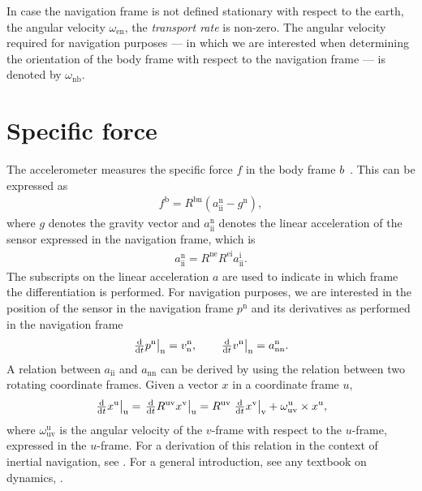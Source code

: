 In case the navigation frame is not defined stationary with respect to the earth, the angular velocity $\omega_{\text{en}}$, \ie the \emph{transport rate} is non-zero. The angular velocity required for navigation purposes --- in which we are interested when determining the orientation of the body frame with respect to the navigation frame --- is denoted by $\omega_{\text{nb}}$.

\section{Specific force}
\label{sec:sensors-specForce}
The accelerometer measures the specific force $f$ in the body frame $b$~\citep{tittertonW:1997}. This can be expressed as
\begin{align}
\label{eq:sen-imu-acc-i}
f^\text{b} = R^{\text{bn}} 
( a_{\text{ii}}^\text{n} - g^\text{n} ),
\end{align}
where $g$ denotes the gravity vector and $a_{\text{ii}}^\text{n}$ denotes the linear acceleration of the sensor expressed in the navigation frame, which is
\begin{align}
a_{\text{ii}}^\text{n} = R^{\text{ne}} R^{\text{ei}} a_{\text{ii}}^\text{i}.
\end{align}
The subscripts on the linear acceleration $a$ are used to indicate in which frame the differentiation is performed. For navigation purposes, we are interested in the position of the sensor in the navigation frame $p^\text{n}$ and its derivatives as performed in the navigation frame 
\begin{align}
\label{eq:sensors-defva}
\left. \tfrac{\textrm{d}}{\textrm{d} t} p^\text{n} \right|_\text{n} = v^\text{n}_\text{n}, \qquad \left. \tfrac{\textrm{d}}{\textrm{d} t} v^\text{n} \right|_\text{n} = a^\text{n}_\text{nn}.
\end{align}
A relation between $a_{\text{ii}}$ and $a_{\text{nn}}$ can be derived by using the relation between two rotating coordinate frames. Given a vector $x$ in a coordinate frame $u$,
\begin{align}
\label{eq:sensors-rotatingCF}
\left. \tfrac{\textrm{d}}{\textrm{d} t} x^\text{u} \right|_\text{u} = \left. \tfrac{\textrm{d}}{\textrm{d} t} R^\text{uv} x^\text{v} \right|_{\text{u}} = R^\text{uv} \left. \tfrac{\textrm{d}}{\textrm{d} t} x^\text{v} \right|_{\text{v}} + \omega_{\text{uv}}^\text{u} \times x^\text{u},
\end{align}
where $\omega_{\text{uv}}^\text{u}$ is the angular velocity of the $v$-frame with respect to the $u$-frame, expressed in the $u$-frame. For a derivation of this relation in the context of inertial navigation, see \cite{hol:2011,tittertonW:1997}. For a general introduction, see any textbook on dynamics, \eg \cite{marionT:1995,meriamK:1998}. 

